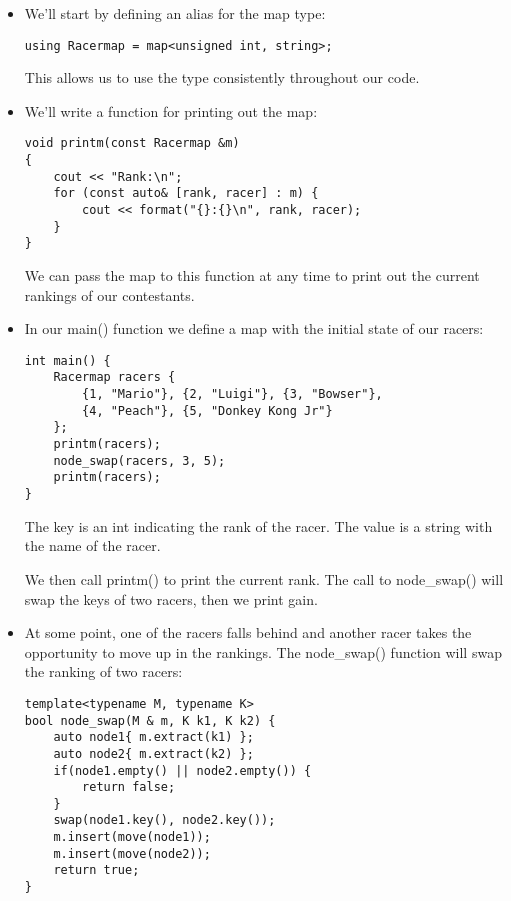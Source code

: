 \begin{itemize}
\item 
We'll start by defining an alias for the map type:

\begin{lstlisting}[style=styleCXX]
using Racermap = map<unsigned int, string>;
\end{lstlisting}

This allows us to use the type consistently throughout our code.

\item 
We'll write a function for printing out the map:

\begin{lstlisting}[style=styleCXX]
void printm(const Racermap &m)
{
	cout << "Rank:\n";
	for (const auto& [rank, racer] : m) {
		cout << format("{}:{}\n", rank, racer);
	}
}
\end{lstlisting}

We can pass the map to this function at any time to print out the current rankings of our contestants.

\item 
In our main() function we define a map with the initial state of our racers:

\begin{lstlisting}[style=styleCXX]
int main() {
	Racermap racers {
		{1, "Mario"}, {2, "Luigi"}, {3, "Bowser"},
		{4, "Peach"}, {5, "Donkey Kong Jr"}
	};
	printm(racers);
	node_swap(racers, 3, 5);
	printm(racers);
}
\end{lstlisting}

The key is an int indicating the rank of the racer. The value is a string with the name of the racer.

We then call printm() to print the current rank. The call to node\_swap() will swap the keys of two racers, then we print gain.

\item 
At some point, one of the racers falls behind and another racer takes the opportunity to move up in the rankings. The node\_swap() function will swap the ranking of two racers:

\begin{lstlisting}[style=styleCXX]
template<typename M, typename K>
bool node_swap(M & m, K k1, K k2) {
	auto node1{ m.extract(k1) };
	auto node2{ m.extract(k2) };
	if(node1.empty() || node2.empty()) {
		return false;
	}
	swap(node1.key(), node2.key());
	m.insert(move(node1));
	m.insert(move(node2));
	return true;
}
\end{lstlisting}


\end{itemize}
